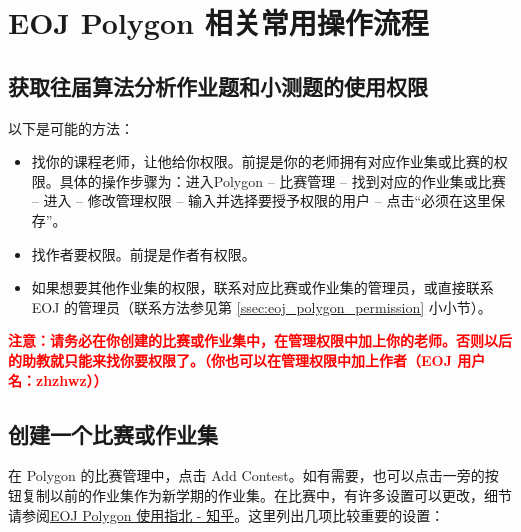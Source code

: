 \documentclass[oneside]{book}
\begin{document}
\section{EOJ Polygon 相关常用操作流程}

\label{sec:polygon_operating_procedures}

\subsection{获取往届算法分析作业题和小测题的使用权限}

\label{ssec:permission_get}

以下是可能的方法：

\begin{itemize}
    \item 找你的课程老师，让他给你权限。前提是你的老师拥有对应作业集或比赛的权限。具体的操作步骤为：进入Polygon -- 比赛管理 -- 找到对应的作业集或比赛 -- 进入 -- 修改管理权限 -- 输入并选择要授予权限的用户 -- 点击``必须在这里保存''。
    \item 找作者要权限。前提是作者有权限。
    \item 如果想要其他作业集的权限，联系对应比赛或作业集的管理员，或直接联系 EOJ 的管理员（联系方法参见第 \ref{ssec:eoj_polygon_permission} 小小节）。
\end{itemize}

\textbf{\textcolor{red}{注意：请务必在你创建的比赛或作业集中，在管理权限中加上你的老师。否则以后的助教就只能来找你要权限了。（你也可以在管理权限中加上作者（EOJ 用户名：zhzhwz））}}

\subsection{创建一个比赛或作业集}

\label{ssec:create_homework_set}

在 Polygon 的比赛管理中，点击 Add Contest。如有需要，也可以点击一旁的按钮复制以前的作业集作为新学期的作业集。在比赛中，有许多设置可以更改，细节请参阅\href{https://zhuanlan.zhihu.com/p/59869879}{EOJ Polygon 使用指北 - 知乎}。这里列出几项比较重要的设置：
\end{document}
